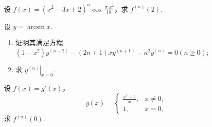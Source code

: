 	\begin{ti}
		设 $f(x) = \left( x^{2} - 3x + 2 \right)^{n} \cos \frac{\uppi x^{2}}{16}$，求 $f^{(n)}(2)$.
	\end{ti}

	\begin{ti}
		设 $y = \arcsin x$.
		\begin{enumerate}
			\item 证明其满足方程 $\left( 1 - x^{2} \right) y^{(n+2)} - (2n + 1) x y^{(n+1)} - n^{2} y^{(n)} = 0 (n \geq 0)$;
			\item 求 $\left. y^{(n)} \right|_{x = 0}$.
		\end{enumerate}
	\end{ti}

	\begin{ti}
		设 $f(x) = g'(x)$，
		\[
			g(x) = \begin{cases}
				\frac{\ee^{x} - 1}{x}, & x \ne 0,\\
				1, & x = 0,
			\end{cases}
		\]
		求 $f^{(n)}(0)$.
	\end{ti}